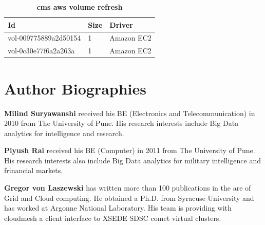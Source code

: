 \documentclass[9pt,twocolumn,twoside]{../../styles/osajnl}
\begin{document}
	\begin{table}[h!]
	\caption{\bf cms aws volume refresh }
	\begin{tabular}{ | m{4.2cm} | m{1cm} | m{2.4cm} |}
		\hline
		Id & Size & Driver \\
		\hline
		vol-009775889a2d50154 & 1 & Amazon EC2\\
		vol-0c30e77f6a2a263a & 1 & Amazon EC2\\
		\hline
	\end{tabular}
	\label{tab:tab8}
\end{table}

	

 
\section*{Author Biographies}
\begingroup
\setlength\intextsep{0pt}
\begin{minipage}{1.0\columnwidth}
  \noindent
  {\bfseries Milind Suryawanshi} received his BE (Electronics and
  Telecommunication) in 2010 from The University of Pune. His research
  interests include Big Data analytics for intelligence and research.
\end{minipage}
\begin{minipage}{1.0\columnwidth} 
  \noindent
  {\bfseries Piyush Rai} received his BE (Computer) in 2011 from The
  University of Pune. His research interests also include Big Data
  analytics for military intelligence and frinancial markets.
\end{minipage}
\begin{minipage}{1.0\columnwidth} 
  \noindent
  {\bfseries Gregor von Laszewski} has written more than 100
  publications in the are of Grid and Cloud computing. He obtained a
  Ph.D. from Syracuse University and has worked at Argonne National
  Laboratory. His team is providing with cloudmesh a client interface
  to XSEDE SDSC comet virtual clusters.
\end{minipage}

\endgroup
\end{document}
